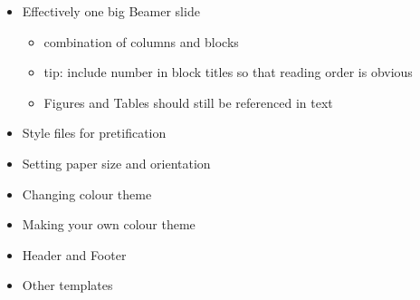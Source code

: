\documentclass[
]{book}
\providecommand{\tightlist}{%
  \setlength{\itemsep}{0pt}\setlength{\parskip}{0pt}}
\begin{document}
\begin{itemize}
\item
  Effectively one big Beamer slide

  \begin{itemize}
  \tightlist
  \item
    combination of columns and blocks
  \item
    tip: include number in block titles so that reading order is obvious
  \item
    Figures and Tables should still be referenced in text
  \end{itemize}
\item
  Style files for pretification
\item
  Setting paper size and orientation
\item
  Changing colour theme
\item
  Making your own colour theme
\item
  Header and Footer
\item
  Other templates
\end{itemize}

  
\end{document}
